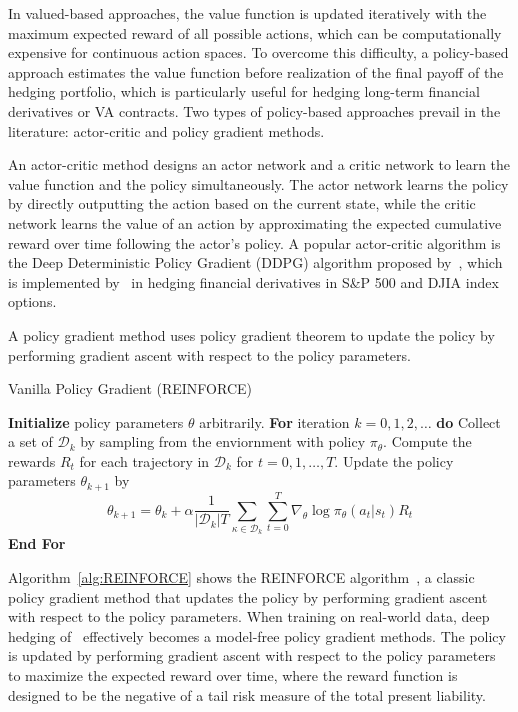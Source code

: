 In valued-based approaches, the value function is updated iteratively with the maximum expected reward of all possible actions, which can be computationally expensive for continuous action spaces.
To overcome this difficulty, a policy-based approach estimates the value function before realization of the final payoff of the hedging portfolio, which is particularly useful for hedging long-term financial derivatives or VA contracts.
Two types of policy-based approaches prevail in the literature: actor-critic and policy gradient methods.

An actor-critic method designs an actor network and a critic network to learn the value function and the policy simultaneously.
The actor network learns the policy by directly outputting the action based on the current state, while the critic network learns the value of an action by approximating the expected cumulative reward over time following the actor's policy.
A popular actor-critic algorithm is the Deep Deterministic Policy Gradient (DDPG) algorithm proposed by~\cite{lillicrap2015continuous}, which is implemented by~\cite{xu2022delta} in hedging financial derivatives in S\&P 500 and DJIA index options.

A policy gradient method uses policy gradient theorem to update the policy by performing gradient ascent with respect to the policy parameters.

\begin{algorithm}[H] 
    \caption{Vanilla Policy Gradient (REINFORCE)}
    \begin{algorithmic}[1] \label{alg:REINFORCE}
    \STATE \textbf{Initialize} policy parameters $\theta$ arbitrarily.
    \STATE  \textbf{For} {iteration $k=0, 1,2,\ldots$} \textbf{do}
        \STATE \quad  Collect a set of $\mathcal{D}_k$ by sampling from the enviornment with policy $\pi_\theta$.
        \STATE  \quad Compute the rewards $R_t$ for each trajectory in $\mathcal{D}_k$ for $t=0,1,\ldots,T$.
        \STATE  \quad Update the policy parameters $\theta_{k+1}$ by 
        \begin{equation*}
            \theta_{k+1} = \theta_k + \alpha \frac{1}{|\mathcal{D}_k|T} \sum_{\mathcal{\kappa} \in \mathcal{D}_k} \sum_{t=0}^{T} \nabla_\theta \log \pi_\theta(a_t | s_t) R_t
        \end{equation*}
    \STATE  \textbf{End For}
    \end{algorithmic}
\end{algorithm}

Algorithm~\ref{alg:REINFORCE} shows the REINFORCE algorithm~\citep{sutton1999policy}, a classic policy gradient method that updates the policy by performing gradient ascent with respect to the policy parameters.
When training on real-world data, deep hedging of~\cite{buehler2019deep} effectively becomes a model-free policy gradient methods. 
The policy is updated by performing gradient ascent with respect to the policy parameters to maximize the expected reward over time, where the reward function is designed to be the negative of a tail risk measure of the total present liability.

